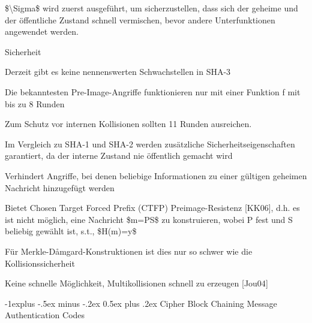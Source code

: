 \documentclass[a4paper]{article}
\makeatletter
\renewcommand{\subsection}{\@startsection{subsection}{2}{0mm}%
 {-1explus -.5ex minus -.2ex}%
 {0.5ex plus .2ex}%
 {\normalfont\normalsize\bfseries}}
\makeatother
\begin{document}
\begin{multicols}{3}
\begin{itemize*}
\begin{itemize*}
            \end{itemize*}
            \item \$\textbackslash Sigma\$ wird zuerst ausgeführt, um sicherzustellen,
            dass sich der geheime und der öffentliche Zustand schnell vermischen,
            bevor andere Unterfunktionen angewendet werden.
            \item Sicherheit
            \begin{itemize*}
                  \item Derzeit gibt es keine nennenswerten Schwachstellen in SHA-3
                  \begin{itemize*} \item Die bekanntesten Pre-Image-Angriffe funktionieren nur mit einer Funktion f mit bis zu 8 Runden \item Zum Schutz vor internen Kollisionen sollten 11 Runden ausreichen. \end{itemize*}
                  \item Im Vergleich zu SHA-1 und SHA-2 werden zusätzliche Sicherheitseigenschaften garantiert, da der interne Zustand nie öffentlich gemacht wird
                  \begin{itemize*} \item Verhindert Angriffe, bei denen beliebige Informationen zu einer gültigen geheimen Nachricht hinzugefügt werden \item Bietet Chosen Target Forced Prefix (CTFP) Preimage-Resistenz {[}KK06{]}, d.h. es ist nicht möglich, eine Nachricht \$m=P\textbar\textbar S\$ zu konstruieren, wobei P fest und S beliebig gewählt ist, s.t., \$H(m)=y\$ \item Für Merkle-Dåmgard-Konstruktionen ist dies nur so schwer wie die Kollisionssicherheit \item Keine schnelle Möglichkeit, Multikollisionen schnell zu erzeugen {[}Jou04{]} \end{itemize*}
            \end{itemize*}
      \end{itemize*}


      \subsection{Cipher Block Chaining Message Authentication
            Codes}


\end{multicols}
\end{document}
